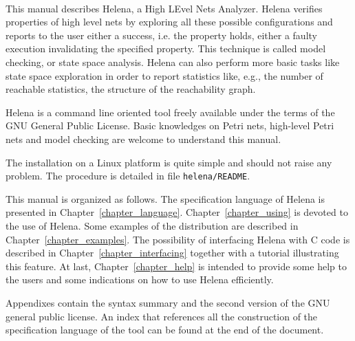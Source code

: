\begin{minipage}{\textwidth}
\begin{minipage}{0.1\textwidth}
~
\end{minipage}
\begin{minipage}{0.8\textwidth}
This manual describes Helena, a High LEvel Nets Analyzer.  Helena
verifies properties of high level nets by exploring all these possible
configurations and reports to the user either a success, i.e.  the
property holds, either a faulty execution invalidating the specified
property.  This technique is called model checking, or state space
analysis.  Helena can also perform more basic tasks like state space
exploration in order to report statistics like, e.g., the number of
reachable statistics, the structure of the reachability graph.

Helena is a command line oriented tool freely available under the
terms of the GNU General Public License.  Basic knowledges on Petri
nets, high-level Petri nets and model checking are welcome to
understand this manual.

The installation on a Linux platform is quite simple and should not
raise any problem.  The procedure is detailed in
file \texttt{helena/README}.

This manual is organized as follows.  The specification language of
Helena is presented in Chapter~\ref{chapter_language}.
Chapter~\ref{chapter_using} is devoted to the use of Helena.  Some
examples of the distribution are described in
Chapter~\ref{chapter_examples}.  The possibility of interfacing Helena
with C code is described in Chapter~\ref{chapter_interfacing} together
with a tutorial illustrating this feature.  At last,
Chapter~\ref{chapter_help} is intended to provide some help to the
users and some indications on how to use Helena efficiently.

Appendixes contain the syntax summary and the second version of the
GNU general public license.  An index that references all the
construction of the specification language of the tool can be found at
the end of the document. 
\end{minipage}
\end{minipage}
